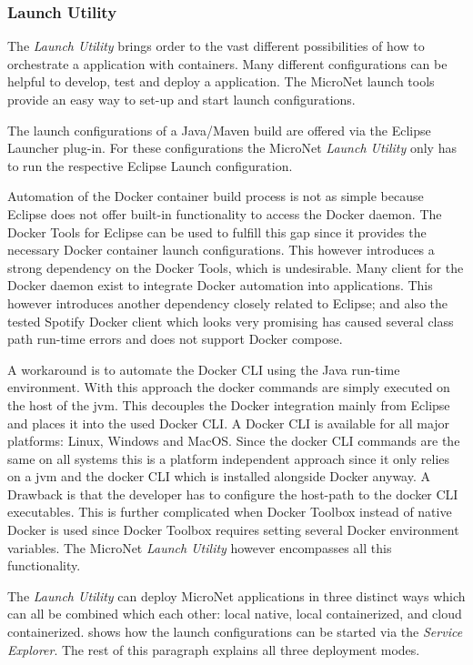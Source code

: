 \subsubsection{Launch Utility}

The \textit{Launch Utility} brings order to the vast different possibilities of
how to orchestrate a \ms{} application with containers. Many different configurations
can be helpful to develop, test and deploy a \ms{} application. The MicroNet
launch tools provide an easy way to set-up and start launch configurations.

The launch configurations of a Java/Maven build are offered via the Eclipse
Launcher plug-in. For these configurations the MicroNet \textit{Launch Utility}
only has to run the respective Eclipse Launch configuration.

Automation of the Docker container build process is not as simple because
Eclipse does not offer built-in functionality to access the Docker daemon.
The Docker Tools for Eclipse can be used to fulfill this gap since it provides
the necessary Docker container launch configurations. This however introduces a
strong dependency on the Docker Tools, which is undesirable. Many client for the
Docker daemon exist to integrate Docker automation into applications. This
however introduces another dependency closely related to Eclipse; and also the
tested Spotify Docker client which looks very promising has caused several class
path run-time errors and does not support Docker compose.

A workaround is to automate the Docker CLI using the Java run-time environment.
With this approach the docker commands are simply executed on the host of the
\gls{jvm}. This decouples the Docker integration mainly from Eclipse and places
it into the used Docker CLI. A Docker CLI is available for all major platforms:
Linux, Windows and MacOS. Since the docker CLI commands are the same on all
systems this is a platform independent approach since it only relies on a
\gls{jvm} and the docker CLI which is installed alongside Docker anyway. A
Drawback is that the developer has to configure the host-path to the docker CLI
executables. This is further complicated when Docker Toolbox instead of native
Docker is used since Docker Toolbox requires setting several Docker environment
variables. The MicroNet \textit{Launch Utility} however encompasses all this
functionality.

The \textit{Launch Utility} can deploy MicroNet applications in three distinct ways which
can all be combined which each other: local native, local containerized, and
cloud containerized.  shows how the launch
configurations can be started via the \textit{Service Explorer}. The rest of this
paragraph explains all three deployment modes.

